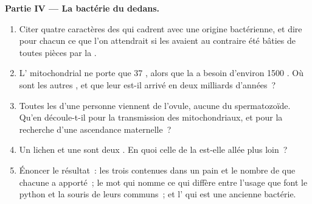 \begin{problem}
\medskip
\noindent\textbf{Partie IV --- La bactérie du dedans.}
\begin{enumerate}[resume]
  \item Citer quatre caractères des  qui cadrent avec une
        origine bactérienne, et dire pour chacun ce que l'on
        attendrait si les  avaient au contraire été
        bâties de toutes pièces par la .
  \item L' mitochondrial ne porte que 37 , alors que la
         a besoin d'environ 1500 . Où sont les
        autres , et que leur est-il arrivé en deux milliards
        d'années~?
  \item Toutes les  d'une personne viennent de l'ovule,
        aucune du spermatozoïde. Qu'en découle-t-il pour la transmission
        des  mitochondriaux, et pour la recherche d'une ascendance
        maternelle~?
  \item Un lichen et une  sont deux . En quoi
        celle de la  est-elle allée plus loin~?
  \item Énoncer le résultat~: les trois  contenues dans un pain
        et le nombre de  que chacune a apporté~; le mot qui
        nomme ce qui diffère entre l'usage que font le python et la
        souris de leurs  communs~; et l' qui est une
        ancienne bactérie.
\end{enumerate}
\end{problem}
